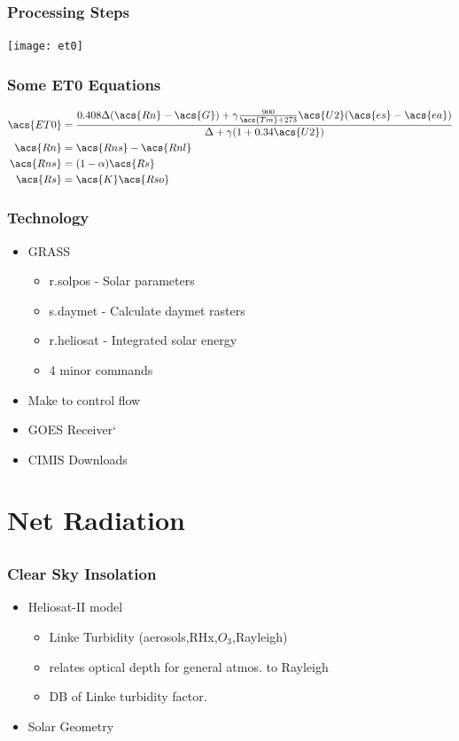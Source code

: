 \documentclass{beamer}
\begin{document}
\begin{frame}
  \frametitle{Processing Steps}
  \texttt{[image: et0]}
  \label{fig:process}
\end{frame}

\begin{frame}
  \frametitle{Some \ac{ET0} Equations}
  \begin{align*}
    \acs{ET0} &= \frac{0.408  \Delta  (\acs{Rn} - \acs{G}) + \gamma \frac{900}{ \acs{Tm} + 273} \acs{U2} (\acs{es} - \acs{ea})}{\Delta + \gamma  (1 + 0.34 \acs{U2})} \\
    \acs{Rn} &= \acs{Rns} - \acs{Rnl} \\
    \acs{Rns} &= (1 - \alpha) \acs{Rs} \\
    \acs{Rs} &= \acs{K} \acs{Rso}
  \end{align*}
\end{frame}

\begin{frame}
  \frametitle{Technology}
  \begin{itemize}
  \item GRASS
    \begin{itemize}
    \item r.solpos - Solar parameters
    \item s.daymet - Calculate daymet rasters
    \item r.heliosat - Integrated solar energy
    \item 4 minor commands
    \end{itemize}

  \item Make to control flow

  \item GOES Receiver`

  \item CIMIS Downloads

  \end{itemize}
\end{frame}
\section[Rs]{Net Radiation}

\subsection{}

 \begin{frame}
   \frametitle{Clear Sky Insolation} 
   \begin{itemize}
   \item Heliosat-II model
     \begin{itemize}
     \item Linke Turbidity (aerosols,\ac{RHx},$O_3$,Rayleigh)
     \item relates optical depth for general atmos. to Rayleigh
     \item DB of Linke turbidity factor.
     \end{itemize}
   \item Solar Geometry
   \end{itemize}
\end{frame}
\end{document}
